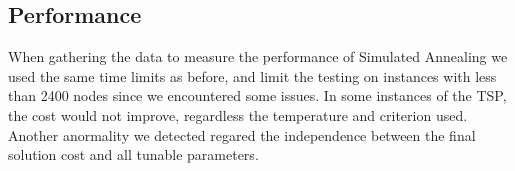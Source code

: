 
\subsection{Performance}

When gathering the data to measure the performance of Simulated Annealing we used the same time limits as before, and limit the testing on instances with less than 2400 nodes since we encountered some issues.
In some instances of the TSP, the cost would not improve, regardless the temperature and criterion used.
Another anormality we detected regared the independence between the final solution cost and all tunable parameters.

